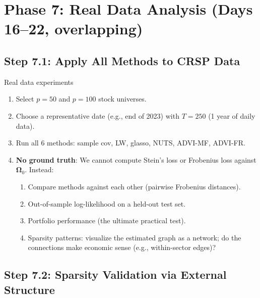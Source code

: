\documentclass[11pt,a4paper]{article}
\newcommand{\bOmega}{\bm{\Omega}}
\begin{document}
\section{Phase 7: Real Data Analysis (Days 16--22, overlapping)}\label{sec:phase7}

\subsection{Step 7.1: Apply All Methods to CRSP Data}

\begin{action}{Real data experiments}
\begin{enumerate}
  \item Select $p=50$ and $p=100$ stock universes.
  \item Choose a representative date (e.g., end of 2023) with $T=250$ (1 year of daily data).
  \item Run all 6 methods: sample cov, LW, glasso, NUTS, ADVI-MF, ADVI-FR.
  \item \textbf{No ground truth}: We cannot compute Stein's loss or Frobenius loss against $\bOmega_0$. Instead:
  \begin{enumerate}[nosep]
    \item[(i)] Compare methods against each other (pairwise Frobenius distances).
    \item[(ii)] Out-of-sample log-likelihood on a held-out test set.
    \item[(iii)] Portfolio performance (the ultimate practical test).
    \item[(iv)] Sparsity patterns: visualize the estimated graph as a network; do the connections make economic sense (e.g., within-sector edges)?
  \end{enumerate}
\end{enumerate}
\end{action}

\subsection{Step 7.2: Sparsity Validation via External Structure}
\end{document}
